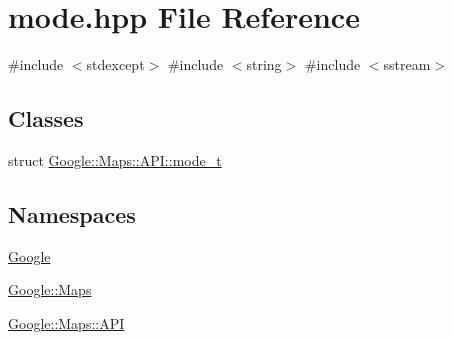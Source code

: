 \hypertarget{a00023}{}\section{mode.\+hpp File Reference}
\label{a00023}
{\ttfamily \#include $<$stdexcept$>$}\newline
{\ttfamily \#include $<$string$>$}\newline
{\ttfamily \#include $<$sstream$>$}\newline
\subsection*{Classes}
\begin{DoxyCompactItemize}
\item 
struct \hyperlink{a00051}{Google\+::\+Maps\+::\+A\+P\+I\+::mode\+\_\+t}
\end{DoxyCompactItemize}
\subsection*{Namespaces}
\begin{DoxyCompactItemize}
\item 
 \hyperlink{a00038}{Google}
\item 
 \hyperlink{a00039}{Google\+::\+Maps}
\item 
 \hyperlink{a00040}{Google\+::\+Maps\+::\+A\+PI}
\end{DoxyCompactItemize}
